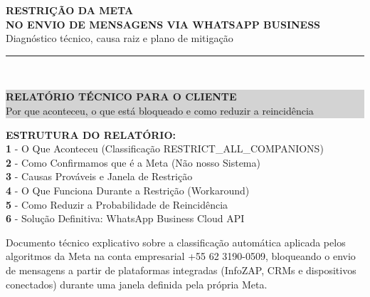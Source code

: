 \documentclass[12pt, a4paper]{article}
\begin{document}
\begin{titlepage}
    \centering
    \vspace*{2.5cm}
    {\Huge \textbf{\textcolor{primaryColor}{RESTRIÇÃO DA META}}} \\
    \vspace{0.5cm}
    {\Large \textbf{NO ENVIO DE MENSAGENS VIA WHATSAPP BUSINESS}} \\
    \vspace{0.3cm}
    {\large Diagnóstico técnico, causa raiz e plano de mitigação} \\
    \vspace{1.5cm}
    \rule{10cm}{1.5pt} \\
    \vspace{0.5cm}
    \colorbox{lightGray}{%
        \parbox{0.9\textwidth}{%
            \centering
            \vspace{0.3cm}
            {\Large \textbf{RELATÓRIO TÉCNICO PARA O CLIENTE}} \\
            \vspace{0.3cm}
            {\large Por que aconteceu, o que está bloqueado e como reduzir a reincidência} \\
            \vspace{0.3cm}
        }%
    }
    \vspace{1.5cm}

    \begin{flushleft}
    \textbf{ESTRUTURA DO RELATÓRIO:} \\
    \vspace{0.2cm}
    \textcolor{primaryColor}{\textbf{1}} - O Que Aconteceu (Classificação RESTRICT\_ALL\_COMPANIONS) \\
    \textcolor{primaryColor}{\textbf{2}} - Como Confirmamos que é a Meta (Não nosso Sistema) \\
    \textcolor{primaryColor}{\textbf{3}} - Causas Prováveis e Janela de Restrição \\
    \textcolor{primaryColor}{\textbf{4}} - O Que Funciona Durante a Restrição (Workaround) \\
    \textcolor{primaryColor}{\textbf{5}} - Como Reduzir a Probabilidade de Reincidência \\
    \textcolor{primaryColor}{\textbf{6}} - Solução Definitiva: WhatsApp Business Cloud API
    \end{flushleft}

    \vfill
    {\small Documento técnico explicativo sobre a classificação automática aplicada pelos algoritmos da Meta na conta empresarial +55 62 3190-0509, bloqueando o envio de mensagens a partir de plataformas integradas (InfoZAP, CRMs e dispositivos conectados) durante uma janela definida pela própria Meta.} \\
    \vspace{1.5cm}


\end{titlepage}
\end{document}
